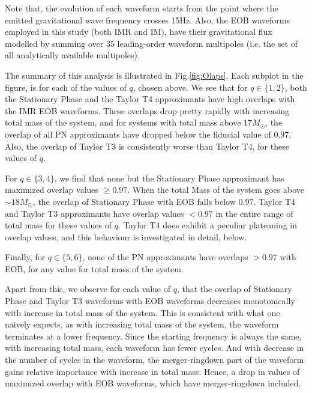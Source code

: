 \documentclass[aps,
prd,
amsmath,
amssymb,
twocolumn,
floatfix,
groupedaddress]{revtex4-1}
\begin{document}
Note that, the evolution of each waveform starts from the point where the emitted gravitational wave frequency crosses 15Hz. Also, the EOB waveforms employed in this study (both IMR and IM), have their gravitational flux modelled by summing over 35 leading-order waveform multipoles (i.e. the set of all analytically available multipoles).

The summary of this analysis is illustrated in Fig.\ref{fig:Olaps}. Each subplot in the figure, is for each of the values of $q$, chosen above. We see that for $q\in \{1,2\}$, both the Stationary Phase and the Taylor T4 approximants have high overlaps with the IMR EOB waveforms. These overlaps drop pretty rapidly with increasing total mass of the system, and for systems with total mass above $17M_{\odot}$, the overlap of all PN approximants have dropped below the fiducial value of $0.97$. Also, the overlap of Taylor T3 is consistently worse than Taylor T4, for these values of $q$.

For $q\in \{3,4\}$, we find that none but the Stationary Phase approximant has maximized overlap values $\geq 0.97$. When the total Mass of the system goes above $\sim 18M_{\odot}$, the overlap of Stationary Phase with EOB falls below $0.97$. Taylor T4 and Taylor T3 approximants have overlap values $< 0.97$ in the entire range of total mass for these values of $q$. Taylor T4 does exhibit a peculiar plateauing in overlap values, and this behaviour is investigated in detail, below.

Finally, for $q\in\{5,6\}$, none of the PN approximants have overlaps $>0.97$ with EOB, for any value for total mass of the system.

Apart from this, we observe for each value of $q$, that the overlap of Stationary Phase and Taylor T3 waveforms with EOB waveforms decreases monotonically with increase in total mass of the system. This is consistent with what one naively expects, as with increasing total mass of the system, the waveform terminates at a lower frequency. Since the starting frequency is always the same, with increasing total mass, each waveform has fewer cycles. And with decrease in the number of cycles in the waveform, the merger-ringdown part of the waveform gains relative importance with increase in total mass. Hence, a drop in values of maximized overlap with EOB waveforms, which have merger-ringdown included.
\end{document}
